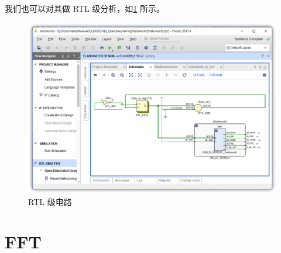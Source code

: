\documentclass[English,Chinese,French,JP,TC,use boldface,simple name]{beaulivre}
\begin{document}
      我们也可以对其做 RTL 级分析，如\cref{fig:RTL_result} 所示。
      \begin{figure}[htbp]
        \centering
        \includegraphics[width=.8\linewidth]{win/helloworld/RTL_result.png}
        \caption{RTL 级电路}
        \label{fig:RTL_result}
      \end{figure}    

\chapter{FFT}
\end{document}
